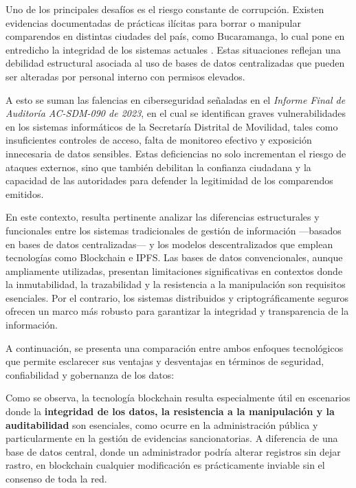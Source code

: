 \documentclass[
    letterpaper, 
    man,   
    spanish,
    12pt,
    donotrepeattitle,
    floatsintext,
    hidelinks %
]{apa7}
\begin{document}
Uno de los principales desafíos es el riesgo constante de corrupción. Existen evidencias documentadas de prácticas ilícitas para borrar o manipular comparendos en distintas ciudades del país, como Bucaramanga, lo cual pone en entredicho la integridad de los sistemas actuales \parencite{blogAletta,procuraduriaBucaramanga}. Estas situaciones reflejan una debilidad estructural asociada al uso de bases de datos centralizadas que pueden ser alteradas por personal interno con permisos elevados.

A esto se suman las falencias en ciberseguridad señaladas en el \textit{Informe Final de Auditoría AC-SDM-090 de 2023}, en el cual se identifican graves vulnerabilidades en los sistemas informáticos de la Secretaría Distrital de Movilidad, tales como insuficientes controles de acceso, falta de monitoreo efectivo y exposición innecesaria de datos sensibles\parencite{auditoriaSDM}. Estas deficiencias no solo incrementan el riesgo de ataques externos, sino que también debilitan la confianza ciudadana y la capacidad de las autoridades para defender la legitimidad de los comparendos emitidos.

En este contexto, resulta pertinente analizar las diferencias estructurales y funcionales entre los sistemas tradicionales de gestión de información —basados en bases de datos centralizadas— y los modelos descentralizados que emplean tecnologías como Blockchain e IPFS. Las bases de datos convencionales, aunque ampliamente utilizadas, presentan limitaciones significativas en contextos donde la inmutabilidad, la trazabilidad y la resistencia a la manipulación son requisitos esenciales. Por el contrario, los sistemas distribuidos y criptográficamente seguros ofrecen un marco más robusto para garantizar la integridad y transparencia de la información.

A continuación, se presenta una comparación entre ambos enfoques tecnológicos que permite esclarecer sus ventajas y desventajas en términos de seguridad, confiabilidad y gobernanza de los datos:



Como se observa, la tecnología blockchain resulta especialmente útil en escenarios donde la \textbf{integridad de los datos, la resistencia a la manipulación y la auditabilidad} son esenciales, como ocurre en la administración pública y particularmente en la gestión de evidencias sancionatorias. A diferencia de una base de datos central, donde un administrador podría alterar registros sin dejar rastro, en blockchain cualquier modificación es prácticamente inviable sin el consenso de toda la red.
\end{document}
